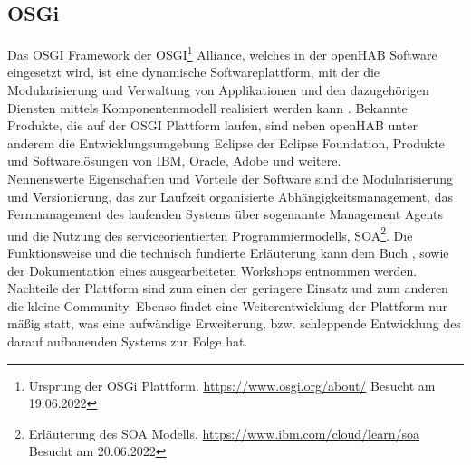     \subsection{OSGi}
    \label{subsec:osgiFramework}
        Das \ac{OSGI} Framework der \acs{OSGI}\footnote{Ursprung der OSGi Plattform. \url{https://www.osgi.org/about/} Besucht am 19.06.2022} 
        Alliance, welches in der openHAB Software eingesetzt wird, ist eine dynamische Softwareplattform, mit der die Modularisierung 
        und Verwaltung von Applikationen und den dazugehörigen Diensten mittels Komponentenmodell realisiert werden kann \cite{funke2009}. Bekannte 
        Produkte, die auf der \acs{OSGI} Plattform laufen, sind neben openHAB unter anderem die Entwicklungsumgebung Eclipse der Eclipse 
        Foundation, Produkte und Softwarelösungen von IBM, Oracle, Adobe und weitere. 
        \\
        Nennenswerte Eigenschaften und Vorteile der Software sind die Modularisierung und Versionierung, das zur Laufzeit organisierte 
        Abhängigkeitsmanagement, das Fernmanagement des laufenden Systems über sogenannte Management Agents und die Nutzung des 
        serviceorientierten Programmiermodells, \ac{SOA}\footnote{Erläuterung des SOA Modells. \url{https://www.ibm.com/cloud/learn/soa} Besucht am 20.06.2022}. 
        Die Funktionsweise und die technisch 
        fundierte Erläuterung kann dem Buch \cite{osgibuch}, sowie der Dokumentation \cite{osgipraesentation} eines ausgearbeiteten Workshops entnommen werden. 
        Nachteile der Plattform sind zum einen der geringere Einsatz und zum anderen die kleine Community. 
        Ebenso findet eine Weiterentwicklung der Plattform nur mäßig statt, was eine aufwändige Erweiterung, bzw. schleppende Entwicklung des darauf 
        aufbauenden Systems zur Folge hat. 

